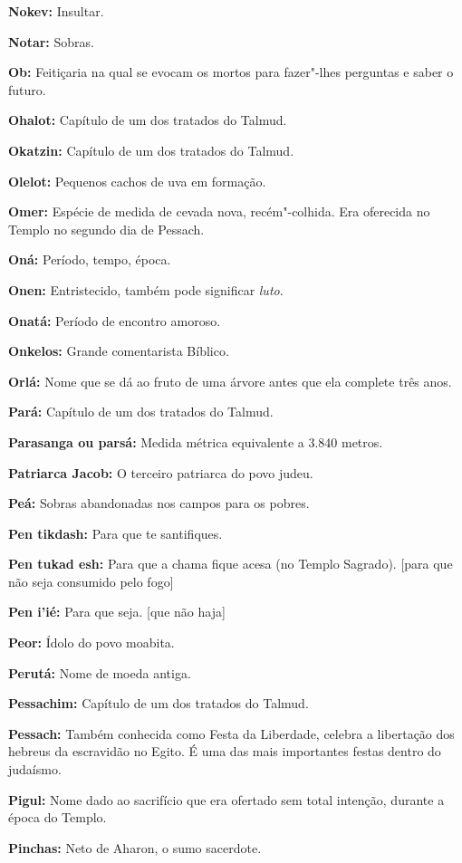 \begin{hangparas}{.25in}{1}
{\textbf{Nokev:} Insultar.

\textbf{Notar:} Sobras.

\textbf{Ob:} Feitiçaria na qual se evocam os mortos para fazer"-lhes
perguntas e saber o futuro.

\textbf{Ohalot:} Capítulo de um dos tratados do Talmud.

\textbf{Okatzin:} Capítulo de um dos tratados do Talmud.

\textbf{Olelot:} Pequenos cachos de uva em formação.

\textbf{Omer:} Espécie de medida de cevada nova, recém"-colhida. 
Era oferecida no Templo no segundo dia de Pessach.

\textbf{Oná:} Período, tempo, época.

\textbf{Onen:} Entristecido, também pode significar \emph{luto}.

\textbf{Onatá:} Período de encontro amoroso.

\textbf{Onkelos:} Grande comentarista Bíblico.

\textbf{Orlá:} Nome que se dá ao fruto de uma árvore antes que 
ela complete três anos.

\textbf{Pará:} Capítulo de um dos tratados do Talmud.

\textbf{Parasanga ou parsá:} Medida métrica equivalente a 3.840 metros.

\textbf{Patriarca Jacob:} O terceiro patriarca do povo judeu.

\textbf{Peá:} Sobras abandonadas nos campos para os pobres.

\textbf{Pen tikdash:} Para que te santifiques.

\textbf{Pen tukad esh:} Para que a chama fique acesa (no Templo Sagrado). [para que não seja consumido pelo fogo]

\textbf{Pen i'ié:} Para que seja. [que não haja]

\textbf{Peor:} Ídolo do povo moabita.

\textbf{Perutá:} Nome de moeda antiga.

\textbf{Pessachim:} Capítulo de um dos tratados do Talmud.

\textbf{Pessach:} Também conhecida como Festa da Liberdade, celebra 
a libertação dos hebreus da escravidão no Egito. É uma das mais 
importantes festas dentro do judaísmo.

\textbf{Pigul:} Nome dado ao sacrifício que era ofertado sem total
intenção, durante a época do Templo.

\textbf{Pinchas:} Neto de Aharon, o sumo sacerdote.

}
\end{hangparas}
